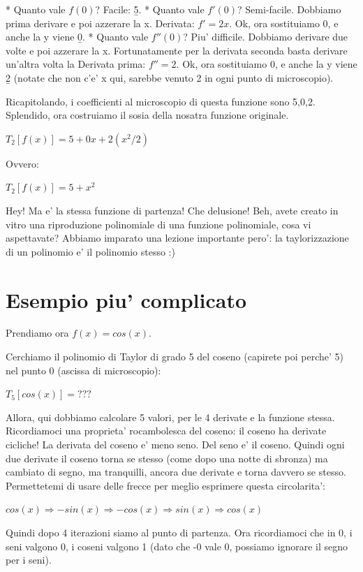 * Quanto vale $f(0)$? Facile: \b{5}.
* Quanto vale $f'(0)$? Semi-facile. Dobbiamo prima derivare e poi azzerare la x. Derivata: $f' = 2x$. Ok, ora sostituiamo 0, e anche la y viene \b{0}.
* Quanto vale $f''(0)$? Piu' difficile. Dobbiamo  derivare due volte e poi azzerare la x. Fortunatamente per la derivata seconda basta derivare un'altra
  volta la Derivata prima: $f'' = 2 $. Ok, ora sostituiamo 0, e anche la y viene \b{2} (notate che non c'e' x qui, sarebbe venuto 2 in ogni punto di microscopio).
 
Ricapitolando, i coefficienti al microscopio di questa funzione sono 5,0,2. Splendido, ora costruiamo il sosia della nosatra funzione originale.


$ T_2[f(x)] = 5 + 0x + 2 (x^2/2) $ 


Ovvero:


$ T_2[f(x)] = 5 + x^2 $


Hey! Ma e' la stessa funzione di partenza! Che delusione! Beh, avete creato in vitro una riproduzione polinomiale di una funzione polinomiale,
cosa vi aspettavate? Abbiamo imparato una lezione importante pero': la taylorizzazione di un polinomio e' il polinomio stesso :) 


\section{Esempio piu' complicato}

Prendiamo ora $f(x) = cos(x)$.

Cerchiamo il polinomio di Taylor di grado 5 del coseno (capirete poi perche' 5) nel punto 0 (ascissa di microscopio):

$ T_5[cos(x)] = ??? $

Allora, qui dobbiamo calcolare 5 valori, per le 4 derivate e la funzione stessa. Ricordiamoci una proprieta' rocambolesca del coseno: il coseno ha derivate cicliche! 
La derivata del coseno e' meno seno. Del seno e' il coseno. Quindi ogni due derivate il coseno torna se stesso (come dopo una notte di sbronza) ma cambiato di segno, 
ma tranquilli, ancora due derivate e torna davvero se stesso. Permettetemi di usare delle frecce per meglio esprimere questa circolarita':

$ cos(x) \Rightarrow  -sin(x) \Rightarrow  -cos(x) \Rightarrow  sin(x) \Rightarrow  cos(x) $

Quindi dopo 4 iterazioni siamo al punto di partenza. Ora ricordiamoci che in 0, i seni valgono 0, i coseni valgono 1 (dato che -0 vale 0, possiamo ignorare il segno per i seni).

